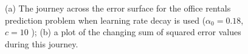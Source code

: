 \documentclass[xcolor={table}]{beamer}
\begin{document}
 \begin{frame} 
\begin{figure}[!htb]
\begin{center}
\caption{(a) The journey across the error surface for the office rentals prediction problem when learning rate decay is used ($\alpha_0 = 0.18$, $c = 10$ ); (b) a plot of the changing sum of squared error values during this journey. }
\label{fig:learningRatesWithDecay}
\end{center}
\end{figure}
\end{frame} 
\end{document}
